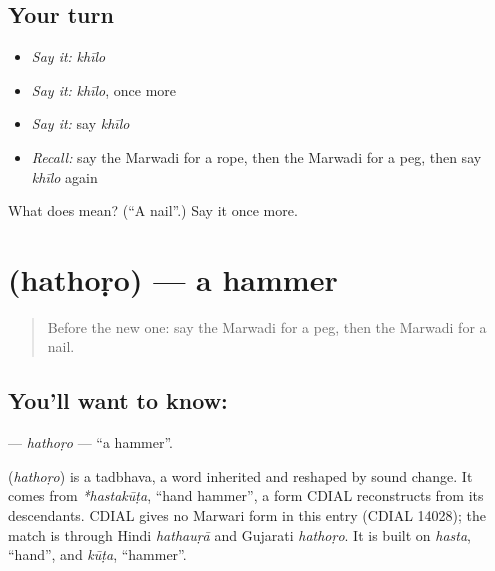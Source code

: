 \subsection*{Your turn}
\begin{itemize}
\raggedright
  \item \emph{Say it:} \emph{khīlo}
  \item \emph{Say it:} \emph{khīlo}, once more
  \item \emph{Say it:} say \emph{khīlo}
  \item \emph{Recall:} say the Marwadi for a rope, then the Marwadi for a peg, then say \emph{khīlo} again
\end{itemize}

\begin{tcolorbox}[breakable,colback=teal!4,colframe=teal!35!black,title={Before you move on}]
What does  mean? (\textquotedblleft{}A nail\textquotedblright{}.) Say it once more.
\end{tcolorbox}
\section[\texorpdfstring{\mw{हथोड़ो} (hathoṛo)}{हथोड़ो (hathoṛo)}]{ (hathoṛo) — a hammer}

\label{lesson:MW-C127-hathoro}



\begin{quote}
Before the new one: say the Marwadi for a peg, then the Marwadi for a nail.
\end{quote}

\subsection*{You'll want to know: }
\textbf{} — \emph{hathoṛo} — \textquotedblleft{}a hammer\textquotedblright{}.

\begin{cousinweb}
\textbf{} (\emph{hathoṛo}) is a tadbhava, a word inherited and reshaped by sound change. It comes from \emph{*hastakūṭa}, \textquotedblleft{}hand hammer\textquotedblright{}, a form CDIAL reconstructs from its descendants. CDIAL gives no Marwari form in this entry (CDIAL 14028); the match is through Hindi \emph{hathauṛā} and Gujarati \emph{hathoṛo}. It is built on \emph{hasta}, \textquotedblleft{}hand\textquotedblright{}, and \emph{kūṭa}, \textquotedblleft{}hammer\textquotedblright{}.
\end{cousinweb}

